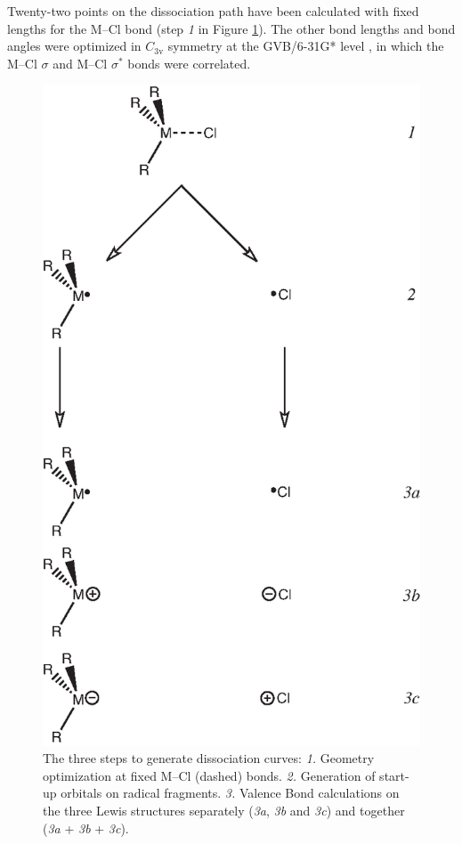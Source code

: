 Twenty-two points on the dissociation path have been calculated with fixed lengths for the \mbox{M--Cl} bond (step \textit{1} in Figure \ref{ch3.fig.scheme1}). The other bond lengths and bond angles were optimized in $C_\mathrm{3v}$ symmetry at the \mbox{GVB/6-31G*} level \cite{gvb1,gvb2,gvb3,gvb4}, in which the \mbox{M--Cl} $\sigma$ and \mbox{M--Cl} $\sigma^{*}$ bonds were correlated.
\begin{figure}[ht]
\begin{center}
\includegraphics{dissociation/figures/scheme1.eps}
\end{center}
\caption{The three steps to generate dissociation curves: \textit{1.} Geometry optimization at fixed M--Cl (dashed) bonds. \textit{2.} Generation of start-up orbitals on radical fragments. \textit{3.} Valence Bond calculations on the three Lewis structures separately (\textit{3a}, \textit{3b} and \textit{3c}) and together (\textit{3a} + \textit{3b} + \textit{3c}).} 
\label{ch3.fig.scheme1}
\end{figure}
